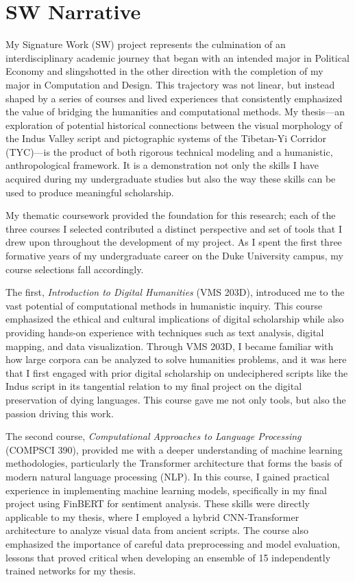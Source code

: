 \documentclass[11pt,a4paper,oneside]{report}
\begin{document}
\chapter*{SW Narrative}
\noindent\hspace{1cm}
My Signature Work (SW) project represents the culmination of an interdisciplinary academic journey that began with an intended major in Political Economy and slingshotted in the other direction with the completion of my major in Computation and Design. This trajectory was not linear, but instead shaped by a series of courses and lived experiences that consistently emphasized the value of bridging the humanities and computational methods. My thesis—an exploration of potential historical connections between the visual morphology of the Indus Valley script and pictographic systems of the Tibetan-Yi Corridor (TYC)—is the product of both rigorous technical modeling and a humanistic, anthropological framework. It is a demonstration not only the skills I have acquired during my undergraduate studies but also the way these skills can be used to produce meaningful scholarship.

My thematic coursework provided the foundation for this research; each of the three courses I selected contributed a distinct perspective and set of tools that I drew upon throughout the development of my project. As I spent the first three formative years of my undergraduate career on the Duke University campus, my course selections fall accordingly.

The first, \textit{Introduction to Digital Humanities} (VMS 203D), introduced me to the vast potential of computational methods in humanistic inquiry. This course emphasized the ethical and cultural implications of digital scholarship while also providing hands-on experience with techniques such as text analysis, digital mapping, and data visualization. Through VMS 203D, I became familiar with how large corpora can be analyzed to solve humanities problems, and it was here that I first engaged with prior digital scholarship on undeciphered scripts like the Indus script in its tangential relation to my final project on the digital preservation of dying languages. This course gave me not only tools, but also the passion driving this work.

The second course, \textit{Computational Approaches to Language Processing} (COMPSCI 390), provided me with a deeper understanding of machine learning methodologies, particularly the Transformer architecture that forms the basis of modern natural language processing (NLP). In this course, I gained practical experience in implementing machine learning models, specifically in my final project using FinBERT for sentiment analysis. These skills were directly applicable to my thesis, where I employed a hybrid CNN-Transformer architecture to analyze visual data from ancient scripts. The course also emphasized the importance of careful data preprocessing and model evaluation, lessons that proved critical when developing an ensemble of 15 independently trained networks for my thesis.
\end{document}
